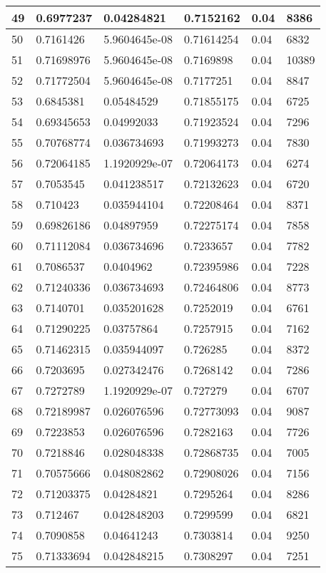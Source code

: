 \begin{longtable}{|l|l|l|l|l|l|}
49 & 0.6977237 & 0.04284821 & 0.7152162 & 0.04 & 8386 \\ \hline 
50 & 0.7161426 & 5.9604645e-08 & 0.71614254 & 0.04 & 6832 \\ \hline 
51 & 0.71698976 & 5.9604645e-08 & 0.7169898 & 0.04 & 10389 \\ \hline 
52 & 0.71772504 & 5.9604645e-08 & 0.7177251 & 0.04 & 8847 \\ \hline 
53 & 0.6845381 & 0.05484529 & 0.71855175 & 0.04 & 6725 \\ \hline 
54 & 0.69345653 & 0.04992033 & 0.71923524 & 0.04 & 7296 \\ \hline 
55 & 0.70768774 & 0.036734693 & 0.71993273 & 0.04 & 7830 \\ \hline 
56 & 0.72064185 & 1.1920929e-07 & 0.72064173 & 0.04 & 6274 \\ \hline 
57 & 0.7053545 & 0.041238517 & 0.72132623 & 0.04 & 6720 \\ \hline 
58 & 0.710423 & 0.035944104 & 0.72208464 & 0.04 & 8371 \\ \hline 
59 & 0.69826186 & 0.04897959 & 0.72275174 & 0.04 & 7858 \\ \hline 
60 & 0.71112084 & 0.036734696 & 0.7233657 & 0.04 & 7782 \\ \hline 
61 & 0.7086537 & 0.0404962 & 0.72395986 & 0.04 & 7228 \\ \hline 
62 & 0.71240336 & 0.036734693 & 0.72464806 & 0.04 & 8773 \\ \hline 
63 & 0.7140701 & 0.035201628 & 0.7252019 & 0.04 & 6761 \\ \hline 
64 & 0.71290225 & 0.03757864 & 0.7257915 & 0.04 & 7162 \\ \hline 
65 & 0.71462315 & 0.035944097 & 0.726285 & 0.04 & 8372 \\ \hline 
66 & 0.7203695 & 0.027342476 & 0.7268142 & 0.04 & 7286 \\ \hline 
67 & 0.7272789 & 1.1920929e-07 & 0.727279 & 0.04 & 6707 \\ \hline 
68 & 0.72189987 & 0.026076596 & 0.72773093 & 0.04 & 9087 \\ \hline 
69 & 0.7223853 & 0.026076596 & 0.7282163 & 0.04 & 7726 \\ \hline 
70 & 0.7218846 & 0.028048338 & 0.72868735 & 0.04 & 7005 \\ \hline 
71 & 0.70575666 & 0.048082862 & 0.72908026 & 0.04 & 7156 \\ \hline 
72 & 0.71203375 & 0.04284821 & 0.7295264 & 0.04 & 8286 \\ \hline 
73 & 0.712467 & 0.042848203 & 0.7299599 & 0.04 & 6821 \\ \hline 
74 & 0.7090858 & 0.04641243 & 0.7303814 & 0.04 & 9250 \\ \hline 
75 & 0.71333694 & 0.042848215 & 0.7308297 & 0.04 & 7251 \\ \hline 
\end{longtable}